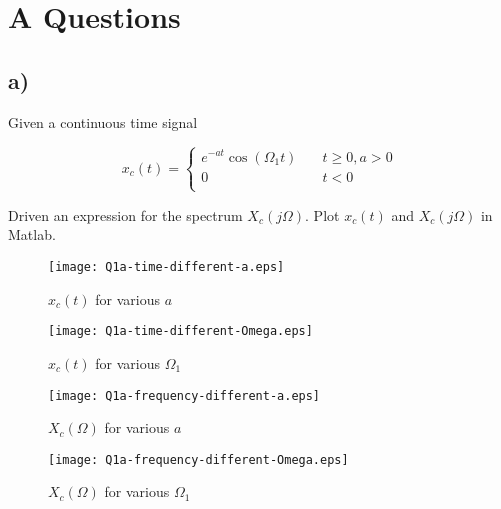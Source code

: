 \documentclass{article}
\newenvironment{homeworkProblem}[1]{
	\section*{#1}
	}{
}
\newenvironment{homeworkSection}[1]{
	\subsection*{#1}
	}{
}
\begin{document}
\newpage



\begin{homeworkProblem}{A Questions}

\begin{homeworkSection}{a)}

Given a continuous time signal 


\begin{equation}\label{Aa1}
x_c(t)=
\begin{cases} e^{-at}\cos{(\Omega_1t)} & \quad t\geq0,a>0\\ 0 & \quad t<0\\ \end{cases}
\end{equation}

Driven an expression for the spectrum $X_c(j\Omega)$. Plot $x_c(t)$ and $X_c(j\Omega)$ in Matlab.


\begin{figure}[H]
\begin{minipage}[t]{0.5\linewidth}
\centering
\texttt{[image: Q1a-time-different-a.eps]}
\caption{$x_c(t)$ for various $a$}
\label{xt1}
\end{minipage}
\begin{minipage}[t]{0.5\linewidth}
\centering
\texttt{[image: Q1a-time-different-Omega.eps]}
\caption{$x_c(t)$ for various $\Omega_1$}
\label{xt2}
\end{minipage}
\end{figure}


\begin{figure}[H]
\begin{minipage}[t]{0.5\linewidth}
\centering
\texttt{[image: Q1a-frequency-different-a.eps]}
\caption{$X_c(\Omega)$ for various $a$}
\label{fig:side:a}
\end{minipage}
\begin{minipage}[t]{0.5\linewidth}
\centering
\texttt{[image: Q1a-frequency-different-Omega.eps]}
\caption{$X_c(\Omega)$ for various $\Omega_1$}
\label{fig:side:b}
\end{minipage}
\end{figure}



\end{homeworkSection}
\end{homeworkProblem}
\end{document}

